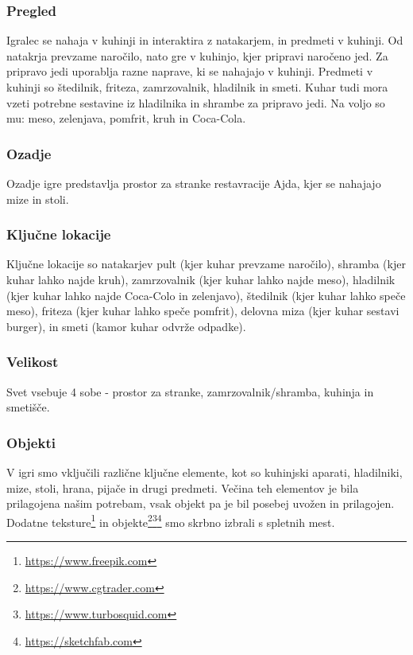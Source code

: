 \documentclass[a4paper]{article}
\begin{document}
\subsubsection{Pregled}
Igralec se nahaja v kuhinji in interaktira z natakarjem, in predmeti v kuhinji. Od natakrja prevzame naročilo, nato gre v kuhinjo, kjer pripravi naročeno jed. 
Za pripravo jedi uporablja razne naprave, ki se nahajajo v kuhinji. Predmeti v kuhinji so štedilnik, friteza, zamrzovalnik, hladilnik in smeti. 
Kuhar tudi mora vzeti potrebne sestavine iz hladilnika in shrambe za pripravo jedi. Na voljo so mu: meso, zelenjava, pomfrit, kruh in Coca-Cola.

\subsubsection{Ozadje}
Ozadje igre predstavlja prostor za stranke restavracije Ajda, kjer se nahajajo mize in stoli.

\subsubsection{Ključne lokacije}
Ključne lokacije so natakarjev pult (kjer kuhar prevzame naročilo), shramba (kjer kuhar lahko najde kruh), zamrzovalnik (kjer kuhar lahko najde meso), hladilnik (kjer kuhar lahko najde Coca-Colo in zelenjavo),
štedilnik (kjer kuhar lahko speče meso), friteza (kjer kuhar lahko speče pomfrit), delovna miza (kjer kuhar sestavi burger), in smeti (kamor kuhar odvrže odpadke). 

\subsubsection{Velikost}
Svet vsebuje 4 sobe - prostor za stranke, zamrzovalnik/shramba, kuhinja in smetišče. 

\subsubsection{Objekti}
V igri smo vključili različne ključne elemente, kot so kuhinjski aparati, hladilniki, mize, stoli, hrana, pijače in drugi predmeti. 
Večina teh elementov je bila prilagojena našim potrebam, vsak objekt pa je bil posebej uvožen in prilagojen. 
Dodatne teksture\footnote{\url{https://www.freepik.com}} in objekte\footnote{\url{https://www.cgtrader.com}}\footnote{\url{https://www.turbosquid.com}}\footnote{\url{https://sketchfab.com}} smo skrbno izbrali s spletnih mest.
\end{document}
